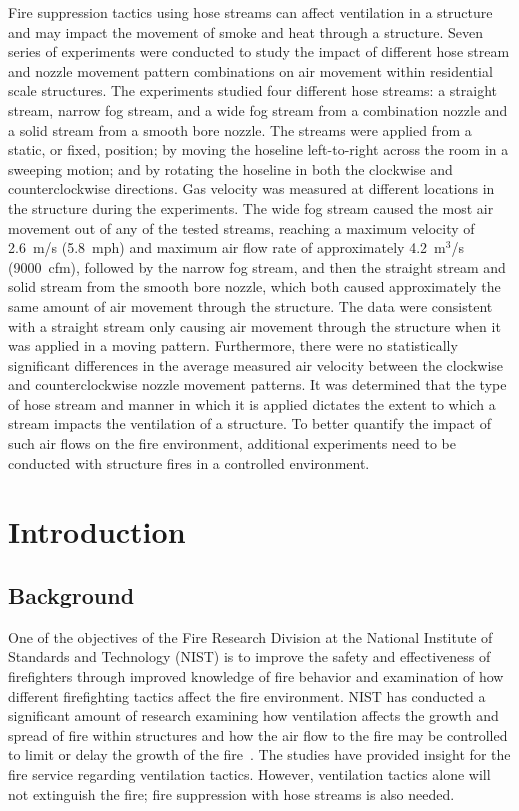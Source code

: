 \documentclass[12pt,oneside]{book}
\begin{document}
Fire suppression tactics using hose streams can affect ventilation in a structure and may impact the movement of smoke and heat through a structure. Seven series of experiments were conducted to study the impact of different hose stream and nozzle movement pattern combinations on air movement within residential scale structures. The experiments studied four different hose streams: a straight stream, narrow fog stream, and a wide fog stream from a combination nozzle and a solid stream from a smooth bore nozzle. The streams were applied from a static, or fixed, position; by moving the hoseline left-to-right across the room in a sweeping motion; and by rotating the hoseline in both the clockwise and counterclockwise directions. Gas velocity was measured at different locations in the structure during the experiments. The wide fog stream caused the most air movement out of any of the tested streams, reaching a maximum velocity of 2.6~m/s (5.8~mph) and maximum air flow rate of approximately 4.2~m$^3$/s (9000~cfm), followed by the narrow fog stream, and then the straight stream and solid stream from the smooth bore nozzle, which both caused approximately the same amount of air movement through the structure. The data were consistent with a straight stream only causing air movement through the structure when it was applied in a moving pattern. Furthermore, there were no statistically significant differences in the average measured air velocity between the clockwise and counterclockwise nozzle movement patterns. It was determined that the type of hose stream and manner in which it is applied dictates the extent to which a stream impacts the ventilation of a structure. To better quantify the impact of such air flows on the fire environment, additional experiments need to be conducted with structure fires in a controlled environment.

\mainmatter

\chapter{Introduction}
\label{chap:intro}
\section{Background}
\label{sec:background}

One of the objectives of the Fire Research Division at the National Institute of Standards and Technology (NIST) is to improve the safety and effectiveness of firefighters through improved knowledge of fire behavior and examination of how different firefighting tactics affect the fire environment. NIST has conducted a significant amount of research examining how ventilation affects the growth and spread of fire within structures and how the air flow to the fire may be controlled to limit or delay the growth of the fire~\cite{madrzykowski2009fire,kerber2009fire}. The studies have provided insight for the fire service regarding ventilation tactics. However, ventilation tactics alone will not extinguish the fire; fire suppression with hose streams is also needed.
\end{document}
